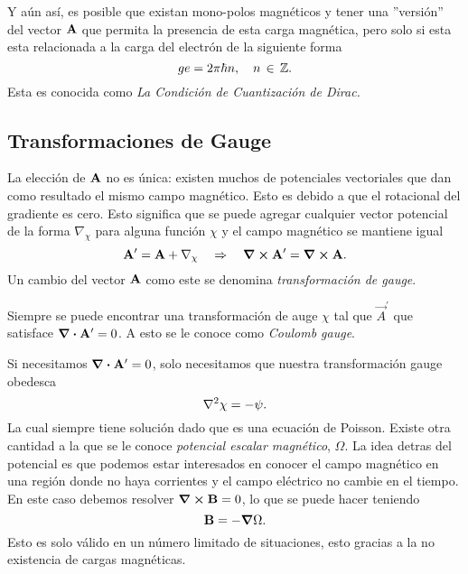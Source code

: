 Y aún así, es posible que existan mono-polos magnéticos y tener una ''versión'' del vector $\vb{A}$ que permita la presencia de esta carga magnética, pero solo si esta esta relacionada a la carga del electrón de la siguiente forma
\begin{equation}
    ge = 2\pi \hbar n, \quad n \, \in \, \mathbb{Z}.
\end{equation}
Esta es conocida como \textit{La Condición de Cuantización de Dirac.}

\subsection{Transformaciones de Gauge}
La elección de $\vb{A}$ no es única: existen muchos de potenciales vectoriales que dan como resultado el mismo campo magnético. Esto es debido a que el rotacional del gradiente es cero. Esto significa que se puede agregar cualquier vector potencial de la forma $\nabla _\chi$ para alguna función $\chi$ y el campo magnético se mantiene igual
\begin{equation}
    \vb{A}^\prime = \vb{A} + \nabla _\chi \quad \Rightarrow \quad \curl{\vb{A}^\prime} = \curl{\vb{A}}.
\end{equation}
Un cambio del vector $\vb{A}$ como este se denomina \textit{transformación de gauge}.

\begin{teorema}
    Siempre se puede encontrar una transformación de auge $\chi$ tal que $\vec{A} ^\prime$ que satisface $\div{\vb{A}^\prime} = 0$. A esto se le conoce como \textit{Coulomb gauge}.
\end{teorema}
Si necesitamos $\div{\vb{A}^\prime} = 0$, solo necesitamos que nuestra transformación gauge obedesca
\begin{equation}
    \laplacian{\chi} = -\psi .
\end{equation}
La cual siempre tiene solución dado que es una ecuación de Poisson. Existe otra cantidad a la que se le conoce \textit{potencial escalar magnético}, $\Omega$. La idea detras del potencial es que podemos estar interesados en conocer el campo magnético en una región donde no haya corrientes y el campo eléctrico no cambie en el tiempo. En este caso debemos resolver $\curl{\vb{B}} = 0$, lo que se puede hacer teniendo
\begin{equation}
    \vb{B} = -\grad{\Omega}.
\end{equation}
Esto es solo válido en un número limitado de situaciones, esto gracias a la no existencia de cargas magnéticas.


